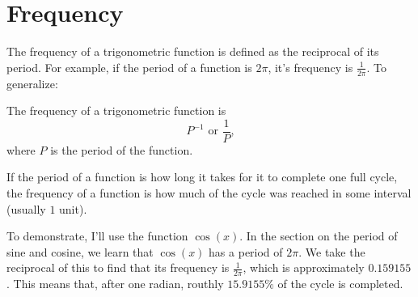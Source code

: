 \clearpage
\section{Frequency}
The frequency of a trigonometric function is defined as the reciprocal of its period. For example, if the period of a function is $2\pi$, it's frequency is $\frac{1}{2\pi}$. To generalize:
\begin{definition}
    The frequency of a trigonometric function is
    \[
        P^{-1} \text{ or } \frac{1}{P} \text{,}
    \]
    where $P$ is the period of the function.
\end{definition}
If the period of a function is how long it takes for it to complete one full cycle, the frequency of a function is how much of the cycle was reached in some interval (usually $1$ unit).

To demonstrate, I'll use the function $\cos(x)$. In the section on the period of sine and cosine, we learn that $\cos(x)$ has a period of $2\pi$. We take the reciprocal of this to find that its frequency is $\frac{1}{2\pi}$, which is approximately $0.159155$. This means that, after one radian, routhly $15.9155\%$ of the cycle is completed.

